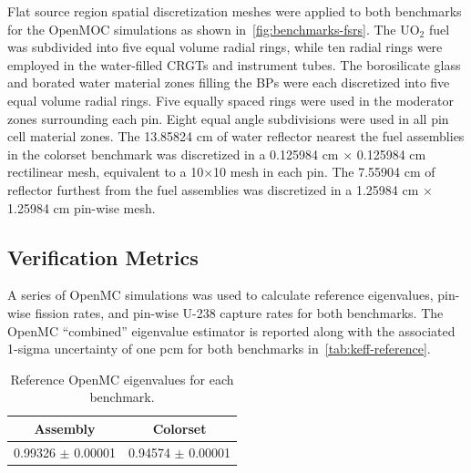 
Flat source region spatial discretization meshes were applied to both benchmarks for the OpenMOC simulations as shown in~\autoref{fig:benchmarks-fsrs}. The UO$_2$ fuel was subdivided into five equal volume radial rings, while ten radial rings were employed in the water-filled CRGTs and instrument tubes. The borosilicate glass and borated water material zones filling the BPs were each discretized into five equal volume radial rings. Five equally spaced rings were used in the moderator zones surrounding each pin. Eight equal angle subdivisions were used in all pin cell material zones. The 13.85824 cm of water reflector nearest the fuel assemblies in the colorset benchmark was discretized in a 0.125984 cm $\times$ 0.125984 cm rectilinear mesh, equivalent to a 10$\times$10 mesh in each pin. The 7.55904 cm of reflector furthest from the fuel assemblies was discretized in a 1.25984 cm $\times$ 1.25984 cm pin-wise mesh.

\subsection{Verification Metrics}
\label{subsec:metrics}

A series of OpenMC simulations was used to calculate reference eigenvalues, pin-wise fission rates, and pin-wise U-238 capture rates for both benchmarks. The OpenMC ``combined'' eigenvalue estimator is reported along with the associated 1-sigma uncertainty of one pcm for both benchmarks in~\autoref{tab:keff-reference}.


\begin{table}[h!]
  \centering
  \caption{Reference OpenMC eigenvalues for each benchmark.}
  \label{tab:keff-reference} 
  \begin{tabular}{c c}
  \toprule
  {\bf Assembly} &
  {\bf Colorset} \\
  \midrule
  0.99326 $\pm$ 0.00001 & 0.94574 $\pm$ 0.00001 \\
  \bottomrule
\end{tabular}
\end{table}

